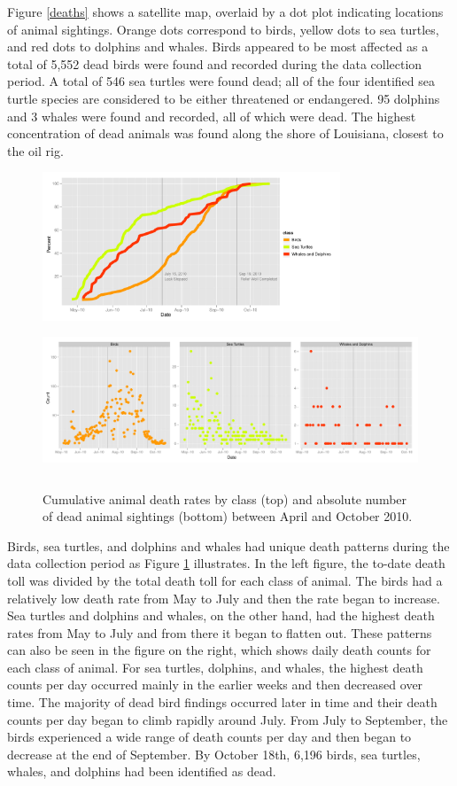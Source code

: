 \documentclass[authoryear,12pt]{elsarticle}
\begin{document}
Figure \ref{deaths} shows a satellite map, overlaid by a dot plot indicating locations of animal sightings. Orange dots correspond to birds, yellow dots to sea turtles, and red dots to dolphins and whales.  Birds appeared to be most affected as a total of 5,552 dead birds were found and recorded during the data collection period.  A total of 546 sea turtles were found dead; all of the four identified sea turtle species are considered to be either threatened or endangered.  95 dolphins and 3 whales were found and recorded, all of which were dead. The highest concentration of dead animals was found along the shore of Louisiana, closest to the oil rig.  

\begin{figure}[htbp] %
   \centering
   \includegraphics[height=1.75in]{death-rates.pdf} 
    \includegraphics[height=1.75in]{daily-death-counts.pdf}
   \caption{Cumulative animal death rates by class  (top) and absolute number of dead animal sightings (bottom) between April and October 2010.\newline}
   \label{death rates}
\end{figure}


Birds, sea turtles, and dolphins and whales had unique death patterns during the data collection period as Figure \ref{death rates}  illustrates. In the left figure, the to-date death toll was divided by the total death toll for each class of animal. The birds had a relatively low death rate from May to July and then the rate began to increase. Sea turtles and dolphins and whales, on the other hand, had the highest death rates from May to July and from there it began to flatten out. These patterns can also be seen in the figure on the right, which shows daily death counts for each class of animal. For sea turtles, dolphins, and whales, the highest death counts per day occurred mainly in the earlier weeks and then decreased over time.  The majority of dead bird findings occurred later in time and their death counts per day began to climb rapidly around July. From July to September, the birds experienced a wide range of death counts per day and then began to decrease at the end of September. By October 18th, 6,196 birds, sea turtles, whales, and dolphins had been identified as dead. 
\end{document}
